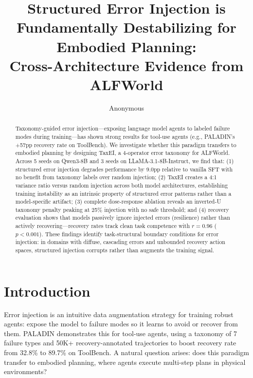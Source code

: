 \documentclass[11pt,a4paper]{article}
\title{Structured Error Injection is Fundamentally Destabilizing for Embodied Planning: \\Cross-Architecture Evidence from ALFWorld}
\author{Anonymous}
\date{}
\begin{document}
\maketitle

\begin{abstract}
Taxonomy-guided error injection---exposing language model agents to labeled failure modes during training---has shown strong results for tool-use agents (e.g., PALADIN's +57pp recovery rate on ToolBench). We investigate whether this paradigm transfers to embodied planning by designing TaxEI, a 4-operator error taxonomy for ALFWorld. Across 5 seeds on Qwen3-8B and 3 seeds on LLaMA-3.1-8B-Instruct, we find that: (1) structured error injection degrades performance by 9.0pp relative to vanilla SFT with no benefit from taxonomy labels over random injection; (2) TaxEI creates a 4:1 variance ratio versus random injection across both model architectures, establishing training instability as an intrinsic property of structured error patterns rather than a model-specific artifact; (3) complete dose-response ablation reveals an inverted-U taxonomy penalty peaking at 25\% injection with no safe threshold; and (4) recovery evaluation shows that models passively ignore injected errors (resilience) rather than actively recovering---recovery rates track clean task competence with $r=0.96$ ($p<0.001$). These findings identify task-structural boundary conditions for error injection: in domains with diffuse, cascading errors and unbounded recovery action spaces, structured injection corrupts rather than augments the training signal.
\end{abstract}

\section{Introduction}

Error injection is an intuitive data augmentation strategy for training robust agents: expose the model to failure modes so it learns to avoid or recover from them. PALADIN \citep{paladin2025} demonstrates this for tool-use agents, using a taxonomy of 7 failure types and 50K+ recovery-annotated trajectories to boost recovery rate from 32.8\% to 89.7\% on ToolBench. A natural question arises: does this paradigm transfer to embodied planning, where agents execute multi-step plans in physical environments?
\end{document}
